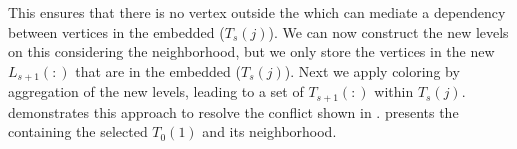 This ensures that there is no vertex outside the \subgraph which can mediate a
\DK dependency between vertices in the embedded \levelGroup ($T_s(j)$). We can
now construct the new levels on this \subgraph considering the neighborhood, but
we only store the vertices in the new \levels $L_{s+1}(:)$ that are in the
embedded \levelGroup ($T_s(j)$). Next we apply \DK coloring by aggregation of
the new levels, leading to a set of \levelGroups $T_{s+1}(:)$ within
$T_s(j)$.  demonstrates this approach to resolve the conflict
shown in .  presents
the \subgraph containing the selected \levelGroup $T_0(1)$ and its \DONE
neighborhood.

